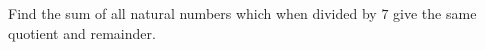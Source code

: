 Find the sum of all natural numbers which when divided by $7$ give the same quotient and remainder.
